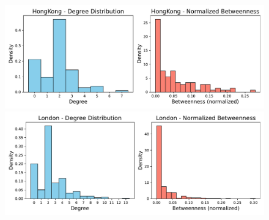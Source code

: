 \begin{figure}[hbtp]
    \centering
    \begin{minipage}{0.48\linewidth}
        \centering
        \includegraphics[width=\linewidth]{figures/task40_plots/deg_bet_HongKong.pdf}
        \end{minipage}%
    \hfill
    \begin{minipage}{0.48\linewidth}
        \centering
        \includegraphics[width=\linewidth]{figures/task40_plots/deg_bet_London.pdf}
    \end{minipage}
\end{figure}

